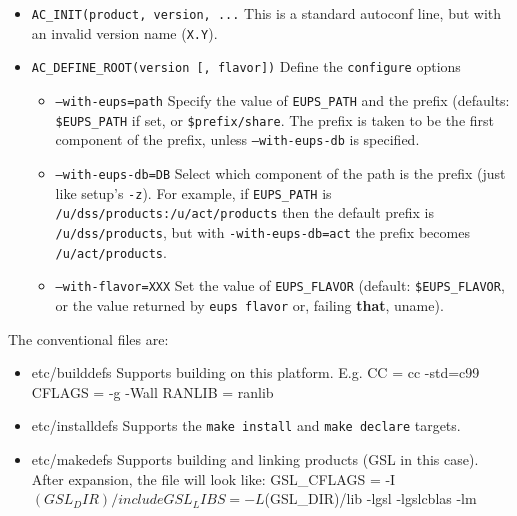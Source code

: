 \documentclass{article}
\newcommand{\code}[1]{\texttt{#1}}
\let\overbatim=\verbatim
\let\oendverbatim=\endverbatim
\renewenvironment{verbatim}
{\center\minipage{16cm}\overbatim}
{\oendverbatim\endminipage\endcenter}
\begin{document}
\begin{itemize}
  \item{\code{AC\_INIT(product, version, ...}}
    This is a standard autoconf line, but with an invalid version name (\code{X.Y}).

  \item{\code{AC\_DEFINE\_ROOT(version [, flavor])}}
    Define the \code{configure} options
    \begin{itemize}
      \item{\code{--with-eups=path}}
        Specify the value of \code{EUPS\_PATH} and the prefix
        (defaults: \code{\$EUPS\_PATH} if set, or \code{\$prefix/share}. The
	prefix is taken to be the first component of the prefix, unless
	\code{--with-eups-db} is specified.

	\item{\code{--with-eups-db=DB}}
	  Select which component of the path is the prefix (just like setup's \code{-z}).
	  For example, if \code{EUPS\_PATH} is
    \code{/u/dss/products:/u/act/products} then the default prefix is
    \code{/u/dss/products}, but with \code{\--with-eups-db=act} the
    prefix becomes \code{/u/act/products}.
    
	\item{\code{--with-flavor=XXX}}
        Set the value of \code{EUPS\_FLAVOR}
        (default: \code{\$EUPS\_FLAVOR}, or the value returned by \code{eups flavor}
	or, failing \textbf{that}, uname).
    \end{itemize}
\end{itemize}

The conventional files are:
\begin{itemize}
   \item{etc/builddefs}
     Supports building on this platform. E.g.
\begin{verbatim}
CC = cc -std=c99
CFLAGS = -g -Wall
RANLIB = ranlib
\end{verbatim}
  
   \item{etc/installdefs}
     Supports the \code{make install} and \code{make declare} targets.
  
   \item{etc/makedefs}
     Supports building and linking products (GSL in this case). After
     expansion, the file will look like:
\begin{verbatim}
GSL_CFLAGS = -I$(GSL_DIR)/include
GSL_LIBS = -L$(GSL_DIR)/lib -lgsl -lgslcblas -lm
\end{verbatim}
\end{itemize}
  
\end{document}
